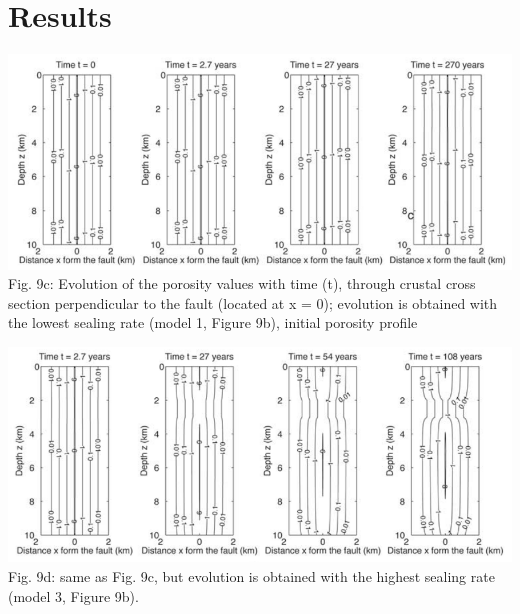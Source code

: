 \newpage

\section*{Results}

\begin{center}
\includegraphics[width=14cm]{python_codes/fieldstone_126/images/grfr03c}\\
{\captionfont Fig. 9c: Evolution of the porosity values with time (t), through crustal cross
section perpendicular to the fault (located at x = 0); 
evolution is obtained with the lowest sealing rate (model 1, Figure 9b),
initial porosity profile}
\end{center}

\begin{center}
\includegraphics[width=14cm]{python_codes/fieldstone_126/images/grfr03d}\\
{\captionfont Fig. 9d: same as Fig. 9c, but evolution is 
obtained with the highest sealing rate (model 3, Figure 9b).}
\end{center}


\newpage

